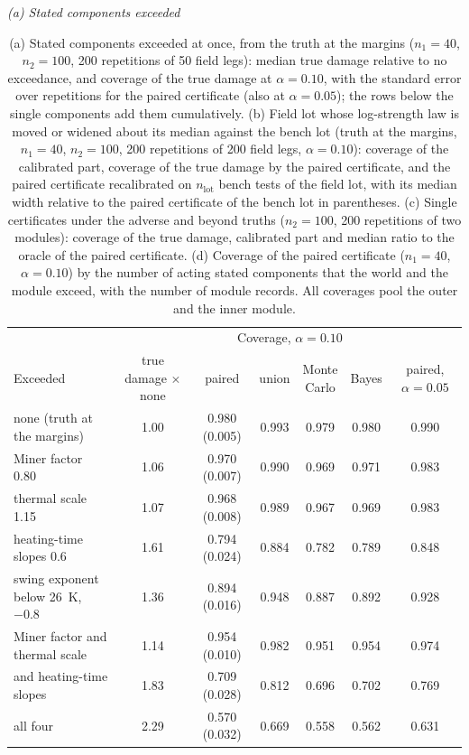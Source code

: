 \begin{table}[htbp]
\centering
\caption{(a) Stated components exceeded at once, from the truth at the margins ($n_1=40$, $n_2=100$, 200 repetitions
of 50 field legs): median true damage relative to no exceedance, and coverage of the true damage at $\alpha=0.10$, with
the standard error over repetitions for the paired certificate (also at $\alpha=0.05$); the rows below the single
components add them cumulatively. (b) Field lot whose log-strength law is moved or widened about its median against the
bench lot (truth at the margins, $n_1=40$, $n_2=100$, 200 repetitions of 200 field legs, $\alpha=0.10$): coverage of the
calibrated part, coverage of the true damage by the paired certificate, and the paired certificate recalibrated on
$n_{\mathrm{lot}}$ bench tests of the field lot, with its median width relative to the paired certificate of the bench
lot in parentheses. (c) Single certificates under the adverse and beyond truths ($n_2=100$, 200 repetitions of two
modules): coverage of the true damage, calibrated part and median ratio to the oracle of the paired certificate.
(d) Coverage of the paired certificate ($n_1=40$, $\alpha=0.10$) by the number of acting stated components that the world
and the module exceed, with the number of module records. All coverages pool the outer and the inner module.}
\label{tab:S6}
\footnotesize
\setlength{\tabcolsep}{3pt}
\textit{(a) Stated components exceeded}\\[2pt]
\begin{tabular*}{\textwidth}{@{\extracolsep{\fill}}lcccccc@{}}
\toprule
& & \multicolumn{4}{c}{Coverage, $\alpha=0.10$} & \\
\cmidrule(lr){3-6}
Exceeded & \makecell{true damage\\$\times$ none} & paired & union & \makecell{Monte\\Carlo} & Bayes &
\makecell{paired,\\$\alpha=0.05$} \\
\midrule
none (truth at the margins) & 1.00 & 0.980 (0.005) & 0.993 & 0.979 & 0.980 & 0.990 \\
Miner factor 0.80 & 1.06 & 0.970 (0.007) & 0.990 & 0.969 & 0.971 & 0.983 \\
thermal scale 1.15 & 1.07 & 0.968 (0.008) & 0.989 & 0.967 & 0.969 & 0.983 \\
heating-time slopes 0.6 & 1.61 & 0.794 (0.024) & 0.884 & 0.782 & 0.789 & 0.848 \\
swing exponent below 26~K, $-0.8$ & 1.36 & 0.894 (0.016) & 0.948 & 0.887 & 0.892 & 0.928 \\
Miner factor and thermal scale & 1.14 & 0.954 (0.010) & 0.982 & 0.951 & 0.954 & 0.974 \\
and heating-time slopes & 1.83 & 0.709 (0.028) & 0.812 & 0.696 & 0.702 & 0.769 \\
all four & 2.29 & 0.570 (0.032) & 0.669 & 0.558 & 0.562 & 0.631 \\
\bottomrule
\end{tabular*}


\end{table}
